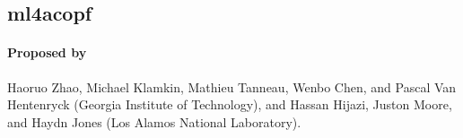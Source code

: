\documentclass[oneside,11pt,dvipsnames]{book}
\begin{document}





\subsection{ml4acopf}
\paragraph*{Proposed by} Haoruo Zhao, Michael Klamkin, Mathieu Tanneau, Wenbo Chen, and Pascal Van Hentenryck (Georgia Institute of Technology), and Hassan Hijazi, Juston Moore, and Haydn Jones (Los Alamos National Laboratory).
\end{document}
